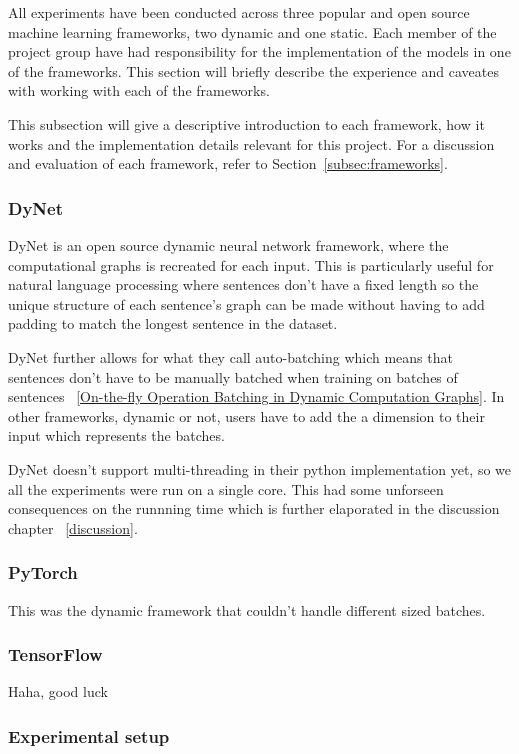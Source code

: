 All experiments have been conducted across three popular and open source machine
learning frameworks, two dynamic and one static. Each member of the project
group have had responsibility for the implementation of the models in one of the
frameworks. This section will briefly describe the experience and caveates with
working with each of the frameworks.

This subsection will give a descriptive introduction to each framework, how it
works and the implementation details relevant for this project. For a discussion
and evaluation of each framework, refer to Section~\ref{subsec:frameworks}.


\subsubsection*{DyNet}

DyNet is an open source dynamic neural network framework, where the
computational graphs is recreated for each input. This is particularly useful
for natural language processing where sentences don't have a fixed length so the
unique structure of each sentence's graph can be made without having to add
padding to match the longest sentence in the dataset.

DyNet further allows for what they call auto-batching which means that sentences
don't have to be manually batched when training on batches of sentences
~\ref{On-the-fly Operation Batching in Dynamic Computation Graphs}. In other
frameworks, dynamic or not, users have to add the a dimension to their input
which represents the batches.

DyNet doesn't support multi-threading in their python implementation yet, so we
all the experiments were run on a single core. This had some unforseen
consequences on the runnning time which is further elaporated in the discussion
chapter ~\ref{discussion}.


\subsubsection*{PyTorch}

This was the dynamic framework that couldn't handle different sized batches.


\subsubsection*{TensorFlow}

Haha, good luck



\subsubsection{Experimental setup}


\pagebreak
